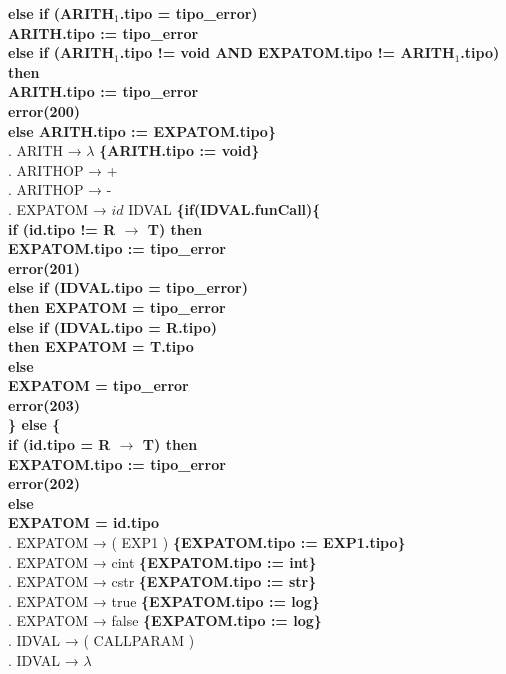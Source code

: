 \begin{tabbing}
    \>                     \> \textbf{else if (ARITH$_1$.tipo = tipo\_error)}\\     \> \> \> \textbf{ARITH.tipo := tipo\_error}\\
    \>                     \> \textbf{else if (ARITH$_1$.tipo != void AND EXPATOM.tipo != ARITH$_1$.tipo) then}\\ 
    \> \> \> \textbf{ARITH.tipo := tipo\_error}\\
    \>                     \> \> \textbf{error(200)}\\
    \>                     \> \textbf{else ARITH.tipo := EXPATOM.tipo\}}\\
    . ARITH → $\lambda$ \textbf{\{ARITH.tipo := void\}}\\
    . ARITHOP → +\\
    . ARITHOP → -\\
    . EXPATOM → $id$ IDVAL \textbf{\{if(IDVAL.funCall)\{}\\
    \> \> \> \textbf{if (id.tipo != R $\rightarrow$ T) then}\\
    \> \> \> \> \textbf{EXPATOM.tipo := tipo\_error}\\
    \> \> \> \> \textbf{error(201)}\\
    \> \> \> \textbf{else if (IDVAL.tipo = tipo\_error)}\\
    \> \> \> \> \textbf{then EXPATOM = tipo\_error}\\
    \> \> \> \textbf{else if (IDVAL.tipo = R.tipo)}\\
    \> \> \> \> \textbf{then EXPATOM = T.tipo}\\
    \> \> \> \textbf{else}\\
    \> \> \> \> \textbf{EXPATOM = tipo\_error}\\
    \> \> \> \> \textbf{error(203)}\\
    \> \> \textbf{\} else \{}\\
    \> \> \> \textbf{if (id.tipo = R $\rightarrow$ T) then}\\
    \> \> \> \> \textbf{EXPATOM.tipo := tipo\_error}\\
    \> \> \> \> \textbf{error(202)}\\
    \> \> \> \textbf{else}\\
    \> \> \> \> \textbf{EXPATOM = id.tipo}\\
    . EXPATOM → ( EXP1 ) \>\textbf{\{EXPATOM.tipo := EXP1.tipo\}}\\
    . EXPATOM → cint \>\textbf{\{EXPATOM.tipo := int\}}\\
    . EXPATOM → cstr \>\textbf{\{EXPATOM.tipo := str\}}\\
    . EXPATOM → true \>\textbf{\{EXPATOM.tipo := log\}}\\
    . EXPATOM → false \>\textbf{\{EXPATOM.tipo := log\}}\\
    . IDVAL → ( CALLPARAM )\\
    . IDVAL → $\lambda$\\
\end{tabbing}